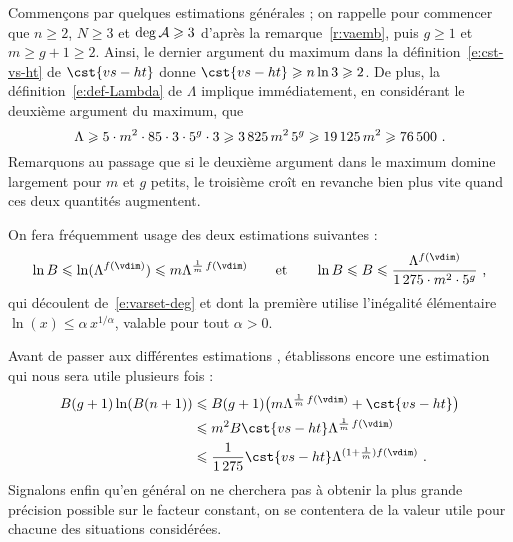 Commençons par quelques estimations générales ; on rappelle pour commencer que
\( n \ge 2 \), \( N \ge 3 \) et \( \deg \mathcal A \geqslant 3 \) d'après la
remarque~\vref{r:vaemb}, puis \( g \ge 1 \) et \( m \ge g + 1
  \ge 2 \). Ainsi, le dernier argument du maximum dans la
définition~\eqref{e:cst-vs-ht} de \( \cst{vs-ht} \) donne
\( \cst{vs-ht} \ge n \ln 3 \ge 2 \).
De plus, la définition~\eqref{e:def-Lambda} de \( \Lambda \) implique
immédiatement, en considérant le deuxième argument du maximum, que
\begin{equation}
  \Lambda
  \geqslant
  5 \cdot m^2 \cdot 85 \cdot 3 \cdot 5^g \cdot 3
  \geqslant
  3\,825 \, m^2 \, 5^g
  \geqslant
  19\,125 \, m^2
  \geqslant
  76\,500
  \text{ .}
\end{equation}
Remarquons au passage que si le deuxième argument dans le maximum domine
largement pour \( m \) et \( g \) petits, le troisième croît en
revanche bien plus vite quand ces deux quantités augmentent.

On fera fréquemment usage des deux estimations suivantes :
\begin{equation}
  \ln B
  \le
  \ln(\Lambda^{f(\vdim)})
  \le
  m \Lambda^{\frac1m\,f(\vdim)}
  \qquad\text{et}\qquad
  \ln B
  \le
  B
  \le
  \frac{ \Lambda^{f(\vdim)} }{ 1\,275 \cdot m^2 \cdot 5^g }
  \pmm,
\end{equation}
qui découlent de~\eqref{e:varset-deg} et dont la première utilise l'inégalité
élémentaire \( \ln(x) \le \alpha \, x^{1/\alpha} \), valable pour tout
\( \alpha > 0 \).

Avant de passer aux différentes estimations , établissons encore
une estimation qui nous sera utile plusieurs fois :
\begin{align}
  B (g + 1) \ln (B (n+1))
  & \le
  B (g + 1) \bigl(
    m \Lambda^{\frac1m\,f(\vdim)}
    + \cst{vs-ht}
  \bigr)
  \\ & \le
  m^2 B \cst{vs-ht} \Lambda^{\frac1m\,f(\vdim)}
  \\ & \le \label{e:adhoc-gen}
  \frac1{1\,275} \cst{vs-ht} \Lambda^{(1 + \frac1m) f(\vdim)}
  \pmm.
\end{align}
Signalons enfin qu'en général on ne cherchera pas à obtenir la plus grande
précision possible sur le facteur constant, on se contentera de la valeur
utile pour chacune des situations considérées.

\medskip


